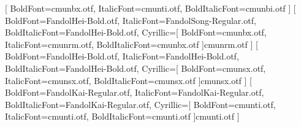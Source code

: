 \usepackage{fontspec}
\setmainfont{cmunrm.otf}[
  BoldFont=cmunbx.otf,
  ItalicFont=cmunti.otf,
  BoldItalicFont=cmunbi.otf
]
[
  BoldFont=FandolHei-Bold.otf,
  ItalicFont=FandolSong-Regular.otf,
  BoldItalicFont=FandolHei-Bold.otf,
  Cyrillic={[
    BoldFont=cmunbx.otf,
    ItalicFont=cmunrm.otf,
    BoldItalicFont=cmunbx.otf
  ]cmunrm.otf}
]
[
  BoldFont=FandolHei-Bold.otf,
  ItalicFont=FandolHei-Bold.otf,
  BoldItalicFont=FandolHei-Bold.otf,
  Cyrillic={[
    BoldFont=cmunsx.otf,
    ItalicFont=cmunsx.otf,
    BoldItalicFont=cmunsx.otf
  ]cmunsx.otf}
]
[
  BoldFont=FandolKai-Regular.otf,
  ItalicFont=FandolKai-Regular.otf,
  BoldItalicFont=FandolKai-Regular.otf,
  Cyrillic={[
    BoldFont=cmunti.otf,
    ItalicFont=cmunti.otf,
    BoldItalicFont=cmunti.otf
  ]cmunti.otf}
]
\newcommand{\bookemph}[1]{{\CJKfamily{examplehei}\itshape #1}}
\newcommand{\bookstrong}[1]{{\CJKfamily{examplehei}\bfseries #1}}
\newcommand{\bookapparatus}[1]{{\CJKfamily{examplekai}\itshape #1}}
\newcommand{\footnoteemph}[1]{{\CJKfamily{examplekai}\itshape #1}}
\setlength{\parindent}{2em}
\setlength{\parskip}{0.3em}
